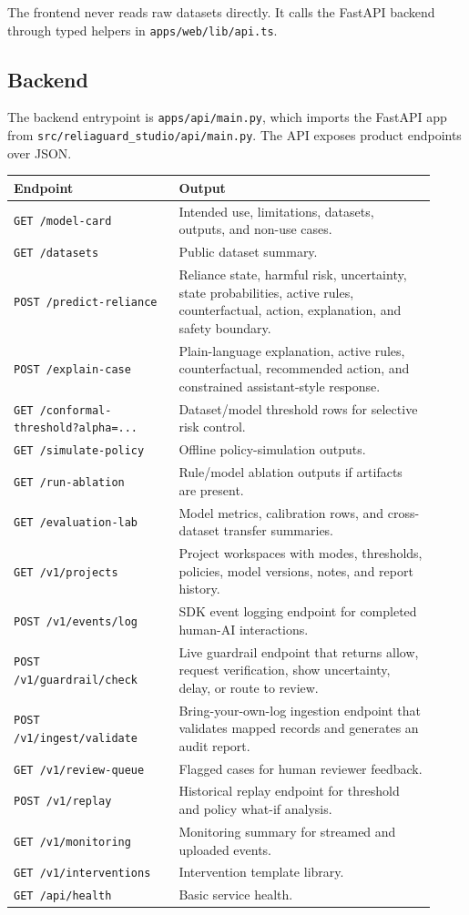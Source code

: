 \documentclass[11pt]{article}
\newcommand{\codepath}[1]{\nolinkurl{#1}}
\begin{document}
The frontend never reads raw datasets directly. It calls the FastAPI backend through typed helpers in \codepath{apps/web/lib/api.ts}.

\subsection{Backend}

The backend entrypoint is \codepath{apps/api/main.py}, which imports the FastAPI app from \codepath{src/reliaguard\_studio/api/main.py}. The API exposes product endpoints over JSON.

\begin{longtable}{p{0.36\linewidth} p{0.56\linewidth}}
\toprule
\textbf{Endpoint} & \textbf{Output} \\
\midrule
\codepath{GET /model-card} & Intended use, limitations, datasets, outputs, and non-use cases. \\
\codepath{GET /datasets} & Public dataset summary. \\
\codepath{POST /predict-reliance} & Reliance state, harmful risk, uncertainty, state probabilities, active rules, counterfactual, action, explanation, and safety boundary. \\
\codepath{POST /explain-case} & Plain-language explanation, active rules, counterfactual, recommended action, and constrained assistant-style response. \\
\codepath{GET /conformal-threshold?alpha=...} & Dataset/model threshold rows for selective risk control. \\
\codepath{GET /simulate-policy} & Offline policy-simulation outputs. \\
\codepath{GET /run-ablation} & Rule/model ablation outputs if artifacts are present. \\
\codepath{GET /evaluation-lab} & Model metrics, calibration rows, and cross-dataset transfer summaries. \\
\codepath{GET /v1/projects} & Project workspaces with modes, thresholds, policies, model versions, notes, and report history. \\
\codepath{POST /v1/events/log} & SDK event logging endpoint for completed human-AI interactions. \\
\codepath{POST /v1/guardrail/check} & Live guardrail endpoint that returns allow, request verification, show uncertainty, delay, or route to review. \\
\codepath{POST /v1/ingest/validate} & Bring-your-own-log ingestion endpoint that validates mapped records and generates an audit report. \\
\codepath{GET /v1/review-queue} & Flagged cases for human reviewer feedback. \\
\codepath{POST /v1/replay} & Historical replay endpoint for threshold and policy what-if analysis. \\
\codepath{GET /v1/monitoring} & Monitoring summary for streamed and uploaded events. \\
\codepath{GET /v1/interventions} & Intervention template library. \\
\codepath{GET /api/health} & Basic service health. \\
\bottomrule
\end{longtable}
\end{document}
